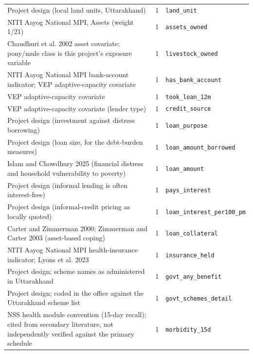 \documentclass[9pt,a4paper,landscape]{article}
\begin{document}
\begin{longtable}{@{}p{9.5cm}p{1.2cm}p{12.5cm}@{}}
\scriptsize Project design (local land units, Uttarakhand) & \scriptsize 1 & \scriptsize\texttt{land\_unit}\\
\scriptsize NITI Aayog National MPI, Assets (weight 1/21) & \scriptsize 1 & \scriptsize\texttt{assets\_owned}\\
\scriptsize Chaudhuri et al. 2002 asset covariate; pony/mule class is this project's exposure variable & \scriptsize 1 & \scriptsize\texttt{livestock\_owned}\\
\scriptsize NITI Aayog National MPI bank-account indicator; VEP adaptive-capacity covariate & \scriptsize 1 & \scriptsize\texttt{has\_bank\_account}\\
\scriptsize VEP adaptive-capacity covariate & \scriptsize 1 & \scriptsize\texttt{took\_loan\_12m}\\
\scriptsize VEP adaptive-capacity covariate (lender type) & \scriptsize 1 & \scriptsize\texttt{credit\_source}\\
\scriptsize Project design (investment against distress borrowing) & \scriptsize 1 & \scriptsize\texttt{loan\_purpose}\\
\scriptsize Project design (loan size, for the debt-burden measures) & \scriptsize 1 & \scriptsize\texttt{loan\_amount\_borrowed}\\
\scriptsize Islam and Chowdhury 2025 (financial distress and household vulnerability to poverty) & \scriptsize 1 & \scriptsize\texttt{loan\_amount}\\
\scriptsize Project design (informal lending is often interest-free) & \scriptsize 1 & \scriptsize\texttt{pays\_interest}\\
\scriptsize Project design (informal-credit pricing as locally quoted) & \scriptsize 1 & \scriptsize\texttt{loan\_interest\_per100\_pm}\\
\scriptsize Carter and Zimmerman 2000; Zimmerman and Carter 2003 (asset-based coping) & \scriptsize 1 & \scriptsize\texttt{loan\_collateral}\\
\scriptsize NITI Aayog National MPI health-insurance indicator; Lyons et al. 2023 & \scriptsize 1 & \scriptsize\texttt{insurance\_held}\\
\scriptsize Project design; scheme names as administered in Uttarakhand & \scriptsize 1 & \scriptsize\texttt{govt\_any\_benefit}\\
\scriptsize Project design; coded in the office against the Uttarakhand scheme list & \scriptsize 1 & \scriptsize\texttt{govt\_schemes\_detail}\\
\scriptsize NSS health module convention (15-day recall); cited from secondary literature, not independently verified against the primary schedule & \scriptsize 1 & \scriptsize\texttt{morbidity\_15d}\\

\end{longtable}
\end{document}
